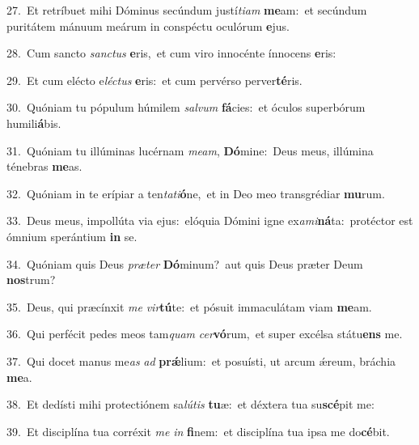 {\numbfont\textcolor{\numbcolor}{27.}}~Et retríbuet mihi Dóminus secúndum justí\-\textit{ti}\-\textit{am} \textbf{me}\-am:~\star et secúndum puritátem mánuum meárum in conspéctu oculórum \textbf{e}\-jus.\par
{\numbfont\textcolor{\numbcolor}{28.}}~Cum sancto \textit{sanc}\-\textit{tus} \textbf{e}\-ris,~\star et cum viro innocénte ínnocens \textbf{e}\-ris:\par
{\numbfont\textcolor{\numbcolor}{29.}}~Et cum elécto e\-\textit{léc}\-\textit{tus} \textbf{e}\-ris:~\star et cum pervérso perver\-\textbf{té}\-ris.\par
{\numbfont\textcolor{\numbcolor}{30.}}~Quóniam tu pópulum húmilem \textit{sal}\-\textit{vum} \textbf{fá}\-cies:~\star et óculos superbórum humili\-\textbf{á}\-bis.\par
{\numbfont\textcolor{\numbcolor}{31.}}~Quóniam tu illúminas lucérnam \textit{me}\-\textit{am}, \textbf{Dó}\-mine:~\star Deus meus, illúmina ténebras \textbf{me}\-as.\par
{\numbfont\textcolor{\numbcolor}{32.}}~Quóniam in te erípiar a ten\-\textit{ta}\-\textit{ti}\textbf{ó}ne,~\star et in Deo meo transgrédiar \textbf{mu}\-rum.\par
{\numbfont\textcolor{\numbcolor}{33.}}~Deus meus, impollúta via ejus:~\dagger elóquia Dómini igne ex\-\textit{a}\-\textit{mi}\textbf{ná}ta:~\star protéctor est ómnium sperántium \textbf{in} se.\par
{\numbfont\textcolor{\numbcolor}{34.}}~Quóniam quis Deus \textit{præ}\-\textit{ter} \textbf{Dó}\-minum?~\star aut quis Deus præter Deum \textbf{nos}\-trum?\par
{\numbfont\textcolor{\numbcolor}{35.}}~Deus, qui præcínxit \textit{me} \textit{vir}\-\textbf{tú}te:~\star et pósuit immaculátam viam \textbf{me}\-am.\par
{\numbfont\textcolor{\numbcolor}{36.}}~Qui perfécit pedes meos tam\textit{quam} \textit{cer}\-\textbf{vó}rum,~\star et super excélsa státu\textbf{ens} me.\par
{\numbfont\textcolor{\numbcolor}{37.}}~Qui docet manus me\textit{as} \textit{ad} \textbf{prǽ}\-lium:~\star et posuísti, ut arcum ǽreum, bráchia \textbf{me}\-a.\par
{\numbfont\textcolor{\numbcolor}{38.}}~Et dedísti mihi protectiónem sa\-\textit{lú}\-\textit{tis} \textbf{tu}\-æ:~\star et déxtera tua su\-\textbf{scé}\-pit me:\par
{\numbfont\textcolor{\numbcolor}{39.}}~Et disciplína tua corréxit \textit{me} \textit{in} \textbf{fi}\-nem:~\star et disciplína tua ipsa me do\-\textbf{cé}\-bit.\par

